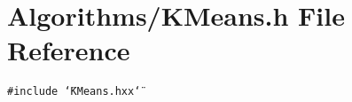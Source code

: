 \section{Algorithms/KMeans.h File Reference}
\label{KMeans_8h}
{\tt \#include \char`\"{}KMeans.hxx\char`\"{}}\par
